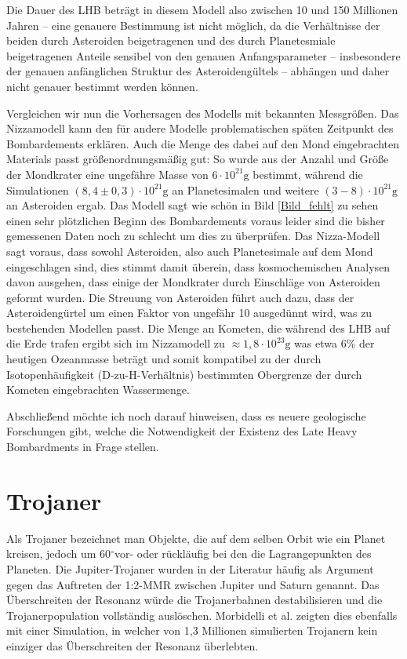 \documentclass[10pt,a4paper,twoside]{article}
\newcommand{\degree}{$^\circ$}
\begin{document}
Die Dauer des LHB beträgt in diesem Modell also zwischen 10 und 150 Millionen Jahren – eine genauere Bestimmung ist nicht möglich, da die Verhältnisse der beiden durch Asteroiden beigetragenen und des durch Planetesmiale beigetragenen Anteile sensibel von den genauen Anfangsparameter – insbesondere der genauen anfänglichen Struktur des Asteroidengültels – abhängen und daher nicht genauer bestimmt werden können\cite{Gomes2005}.

Vergleichen wir nun die Vorhersagen des Modells mit bekannten Messgrößen. Das Nizzamodell kann den für andere Modelle problematischen späten Zeitpunkt des Bombardements erklären. Auch die Menge des dabei auf den Mond eingebrachten Materials passt größenordnungsmäßig gut: So wurde aus der Anzahl und Größe der Mondkrater eine ungefähre Masse von $6 \cdot 10^{21} \mathrm{g}$ bestimmt, während die Simulationen $\left(8,4 \pm 0,3\right) \cdot 10^{21} \mathrm{g}$ an Planetesimalen und weitere $\left( 3-8 \right) \cdot 10^{21} \mathrm{g}$ an Asteroiden ergab.%
Das Modell sagt wie schön in Bild \ref{Bild_fehlt} zu sehen einen sehr plötzlichen Beginn des Bombardements voraus leider sind die bisher gemessenen Daten noch zu schlecht um dies zu überprüfen.
Das Nizza-Modell sagt voraus, dass sowohl Asteroiden, also auch Planetesimale auf dem Mond eingeschlagen sind, dies stimmt damit überein, dass kosmochemischen Analysen davon ausgehen, dass einige der Mondkrater durch Einschläge von Asteroiden geformt wurden.
Die Streuung von Asteroiden führt auch dazu, dass der Asteroidengürtel um einen Faktor von ungefähr 10 ausgedünnt wird, was zu bestehenden Modellen passt.  %
Die Menge an Kometen, die während des LHB auf die Erde trafen ergibt sich im Nizzamodell zu $\approx 1,8 \cdot 10^{23} \mathrm{g}$ was etwa 6\% der heutigen Ozeanmasse beträgt und somit kompatibel zu der durch Isotopenhäufigkeit (D-zu-H-Verhältnis) bestimmten Obergrenze der durch Kometen eingebrachten Wassermenge\cite{Gomes2005}. %

Abschließend möchte ich noch darauf hinweisen, dass es neuere geologische Forschungen gibt, welche die Notwendigkeit der Existenz des Late Heavy Bombardments in Frage stellen\cite{Spudis2011}. %

\FloatBarrier
\section{Trojaner}\label{Trojaner}
Als Trojaner bezeichnet man Objekte, die auf dem selben Orbit wie ein Planet kreisen, jedoch um 60\degree vor- oder rückläufig bei den die Lagrangepunkten %
des Planeten.
Die Jupiter-Trojaner wurden in der Literatur häufig als Argument gegen das Auftreten der 1:2-MMR zwischen Jupiter und Saturn genannt. Das Überschreiten der Resonanz würde die Trojanerbahnen destabilisieren und die Trojanerpopulation vollständig auslöschen\cite{Morbidelli2005}. %
Morbidelli et al. zeigten dies ebenfalls mit einer Simulation, in welcher von 1,3 Millionen simulierten Trojanern kein einziger das Überschreiten der Resonanz überlebten\cite{Morbidelli2005}.
\end{document}
